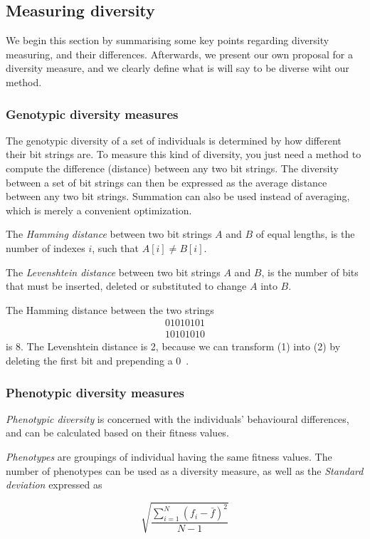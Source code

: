 \subsection{Measuring diversity}
We begin this section by summarising some key points regarding diversity measuring, and their differences. Afterwards, we present our own proposal for a diversity measure, and we clearly define what is will say to be diverse wiht our method. 

\subsubsection{Genotypic diversity measures}
The genotypic diversity of a set of individuals is determined by how different their bit strings are.
To measure this kind of diversity, you just need a method to compute the difference (distance) between any two bit strings.
The diversity between a set of bit strings can then be expressed as the average distance between any two bit strings.
Summation can also be used instead of averaging, which is merely a convenient optimization.

The \emph{Hamming distance} between two bit strings $A$ and $B$ of equal lengths, is the number of indexes $i$, such that $A[i] \neq B[i]$.

The \emph{Levenshtein distance} between two bit strings $A$ and $B$, is the number of bits that must be inserted, deleted or substituted to change $A$ into $B$.

The Hamming distance between the two strings
%
\begin{align}
    01010101 \\
    10101010
\end{align}
%
is 8. The Levenshtein distance is 2, because we can transform (1) into (2) by deleting the first bit and prepending a $0$~\cite{1250187}.

\subsubsection{Phenotypic diversity measures}
\emph{Phenotypic diversity} is concerned with the individuals' behavioural differences, and can be calculated based on their fitness values.

\emph{Phenotypes} are groupings of individual having the same fitness values. 
The number of phenotypes can be used as a diversity measure, as well as the \emph{Standard deviation} expressed as

\[\sqrt{\frac{\sum_{i=1}^N{(f_i-\bar{f})^2}}{N-1}}\]

